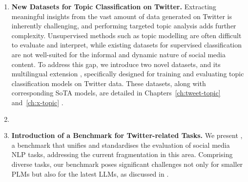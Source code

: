 \begin{enumerate}[label=I.\arabic*]
    \item \label{contribution:1} \textbf{New Datasets for Topic Classification on Twitter.} Extracting meaningful insights from the vast amount of data generated on Twitter is inherently challenging, and performing targeted topic analysis adds further complexity. Unsupervised methods such as topic modelling are often difficult to evaluate and interpret, while existing datasets for supervised classification are not well-suited for the informal and dynamic nature of social media content. To address this gap, we introduce two novel datasets, {\TweetTopic} and its multilingual extension {\XTOPIC}, specifically designed for training and evaluating topic classification models on Twitter data. These datasets, along with corresponding \ac{SoTA} models, are detailed in Chapters~\ref{ch:tweet-topic} and~\ref{ch:x-topic} . 
    \item \label{contribution:2} 
    \item \label{contribution:3} \textbf{Introduction of a Benchmark for Twitter-related  Tasks.} We present {\DATASET}, a benchmark that unifies and standardises the evaluation of social media \ac{NLP} tasks, addressing the current fragmentation in this area. Comprising  diverse tasks, our benchmark poses significant challenges not only for smaller \acp{PLM} but also for the latest \acp{LLM}, as discussed in .
\end{enumerate} 

